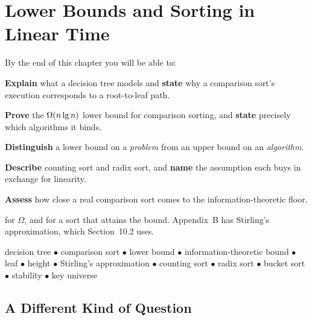 \chapter{Lower Bounds and Sorting in Linear Time}\label{ch:lowerbound}

\begin{outcomes}
By the end of this chapter you will be able to:
\begin{tight}
  \item \textbf{Explain} what a decision tree models and \textbf{state} why a
        comparison sort's execution corresponds to a root-to-leaf path.
  \item \textbf{Prove} the $\Omega(n \operatorname{lg} n)$ lower bound for comparison
        sorting, and \textbf{state} precisely which algorithms it binds.
  \item \textbf{Distinguish} a lower bound on a \emph{problem} from an upper
        bound on an \emph{algorithm}.
  \item \textbf{Describe} counting sort and radix sort, and \textbf{name} the
        assumption each buys in exchange for linearity.
  \item \textbf{Assess} how close a real comparison sort comes to the
        information-theoretic floor.
\end{tight}
\end{outcomes}

\begin{prereq}
 for $\Omega$, and  for a sort that attains
the bound. Appendix~B has Stirling's approximation, which Section~10.2 uses.
\end{prereq}

\begin{keyterms}
decision tree $\bullet$ comparison sort $\bullet$ lower bound $\bullet$
information-theoretic bound $\bullet$ leaf $\bullet$ height $\bullet$
Stirling's approximation $\bullet$ counting sort $\bullet$ radix sort
$\bullet$ bucket sort $\bullet$ stability $\bullet$ key universe
\end{keyterms}

\section{A Different Kind of Question}

